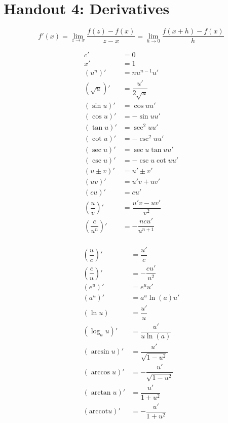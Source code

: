 \documentclass[a4paper,12pt,openany]{book}
\begin{document}
\section{Handout 4: Derivatives}

\[
    f'(x) = \lim_{z \to x} \dfrac{f(z) - f(x)}{z-x} = \lim_{h \to 0} \dfrac{f(x+h) - f(x)}{h}
\]

\begin{multicols}{2}
    \begin{align*}
        c' &= 0 \\
        x' &= 1 \\
        (u^n)' &= nu^{n-1}u' \\
        (\sqrt{u})' &= \dfrac{u'}{2\sqrt{u}} \\
        (\sin{u})' &= \cos{u}u' \\
        (\cos{u})' &= -\sin{u}u' \\
        (\tan{u})' &= \sec^2{u}u' \\
        (\cot{u})' &= -\csc^2{u}u' \\
        (\sec{u})' &= \sec{u}\tan{u}u' \\
        (\csc{u})' &= -\csc{u}\cot{u}u' \\
        (u\pm v)' &= u' \pm v' \\
        (uv)' &= u'v + uv' \\  
        (cu)' &= cu' \\
        \left(\dfrac{u}{v}\right)' &= \dfrac{u'v - uv'}{v^2} \\
        \left(\dfrac{c}{u^n}\right)' &= -\dfrac{ncu'}{u^{n+1}} \\
    \end{align*}
    \vfill\null
    \columnbreak

    \begin{align*}
        (\dfrac{u}{c})' &= \dfrac{u'}{c} \\
        (\dfrac{c}{u})' &= -\dfrac{cu'}{u^2} \\
        (e^u)' &= e^u u' \\
        (a^u)' &= a^u \ln(a)u' \\
        (\ln{u}) &= \dfrac{u'}{u} \\
        (\log_a{u})' &= \dfrac{u'}{u\ln(a)} \\
        (\arcsin{u})' &= \dfrac{u'}{\sqrt{1-u^2}} \\
        (\arccos{u})' &= -\dfrac{u'}{\sqrt{1-u^2}} \\
        (\arctan{u})' &= \dfrac{u'}{1+u^2} \\
        (\text{arccot}{u})' &= -\dfrac{u'}{1+u^2} \\
    \end{align*}
\end{multicols}
\pagebreak
\end{document}
